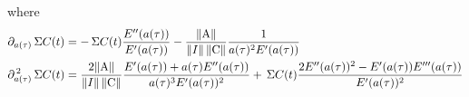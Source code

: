 \documentclass[a4paper]{base}
\begin{document}
    where
    \begin{equation}\label{eq:Exp:0a}
        \begin{aligned}
            \partial_{a(\tau)}\tot{C}(t) &= -\tot{C}(t) \frac{E^{\prime\prime}(a(\tau))}{E^{\prime}(a(\tau))} - \frac{\dn{\norm{A}}}{\norm{I}\dn{\norm{C}}} \frac{1}{a(\tau)^{2}E^{\prime}(a(\tau))}\\ 
            \partial_{a(\tau)}^{\,2}\tot{C}(t)
            &= \frac{2\dn{\norm{A}}}{\norm{I}\dn{\norm{C}}}\frac{E^{\prime}(a(\tau)) + a(\tau) E^{\prime\prime}(a(\tau))}
            {a(\tau)^{3}E^{\prime}(a(\tau))^{2}} + \tot{C}(t) \frac{2 E^{\prime\prime}(a(\tau))^{2} - E^{\prime}(a(\tau)) E^{\prime\prime\prime}(a(\tau))}{E^{\prime}(a(\tau))^2}
        \end{aligned}
    \end{equation}



 

\end{document}
